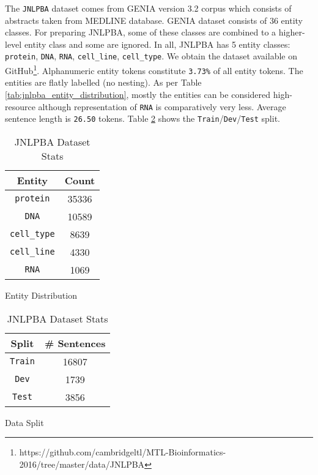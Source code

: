 The \texttt{JNLPBA}\cite{} dataset comes from GENIA version 3.2 corpus\cite{} which consists of abstracts taken from MEDLINE database. GENIA dataset consists of 36 entity classes. For preparing JNLPBA, some of these classes are combined to a higher-level entity class and some are ignored. In all, JNLPBA has 5 entity classes: \texttt{protein}, \texttt{DNA}, \texttt{RNA}, \texttt{cell\_line}, \texttt{cell\_type}. We obtain the dataset available on GitHub\footnote{https://github.com/cambridgeltl/MTL-Bioinformatics-2016/tree/master/data/JNLPBA}. Alphanumeric entity tokens constitute \texttt{3.73\%} of all entity tokens. The entities are flatly labelled (no nesting). As per Table \ref{tab:jnlpba_entity_distribution}, mostly the entities can be considered high-resource although representation of \texttt{RNA} is comparatively very less. Average sentence length is \texttt{26.50} tokens. Table \ref{tab:jnlpba_dataset_split} shows the \texttt{Train}/\texttt{Dev}/\texttt{Test} split. 

\begin{table}[h!]
\begin{subtable}[t]{.48\linewidth}
\centering
\begin{tabular}{|c|c|}\hline
	\textbf{Entity} & \textbf{Count}\\\hline
	\texttt{protein} & 35336\\\hline
    \texttt{DNA} & 10589\\\hline
    \texttt{cell\_type} & 8639\\\hline
    \texttt{cell\_line} & 4330\\\hline
    \texttt{RNA} & 1069\\\hline
	\end{tabular}
	\caption{Entity Distribution}
	\label{tab:jnlpba_entity_distribution}
\end{subtable}
\begin{subtable}[t]{.48\linewidth}
\centering
\begin{tabular}{|c|c|}\hline
	\textbf{Split} & \textbf{\# Sentences}\\\hline
	\texttt{Train} & 16807\\\hline
	\texttt{Dev} & 1739\\\hline
	\texttt{Test} & 3856\\\hline
	\end{tabular}
	\caption{Data Split}
	\label{tab:jnlpba_dataset_split}
\end{subtable}
\caption{JNLPBA Dataset Stats}
\end{table}

